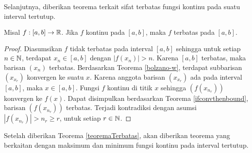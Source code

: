 Selanjutnya, diberikan teorema terkait sifat terbatas fungsi kontinu pada suatu interval tertutup. 

\begin{teorema}\label{teoremaTerbatas}
    Misal $f:[a,b] \to \mathbb{R}$. Jika $f$ kontinu pada $[a,b]$, maka $f$ terbatas pada $[a,b]$.
\end{teorema}
\begin{proof}
    Diasumsikan $f$ tidak terbatas pada interval $[a,b]$ sehingga untuk setiap $n \in  \mathbb{N}$, terdapat $x_n \in [a,b]$ dengan $|f(x_n)| > n$. Karena $[a,b]$ terbatas, maka barisan $(x_n)$ terbatas. Berdasarkan Teorema \ref{bolzano-w}, terdapat subbarisan $(x_{x_r})$ konvergen ke suatu $x$. Karena anggota barisan $(x_{x_r})$ ada pada interval $[a,b]$, maka $x \in [a,b]$. Fungsi $f$ kontinu di titik $x$ sehingga $(f(x_{n_r}))$ konvergen ke $f(x)$. Dapat disimpulkan berdasarkan Teorema \ref{ifconvthenbound}, barisan $(f(x_{n_r}))$ terbatas. Terjadi kontradiksi dengan asumsi $|f(x_{n_r})| > n_r \geq r$, untuk setiap $r \in \mathbb{N}$.
\end{proof}

Setelah diberikan Teorema \ref{teoremaTerbatas}, akan diberikan teorema yang berkaitan dengan maksimum dan minimum fungsi kontinu pada interval tertutup.

